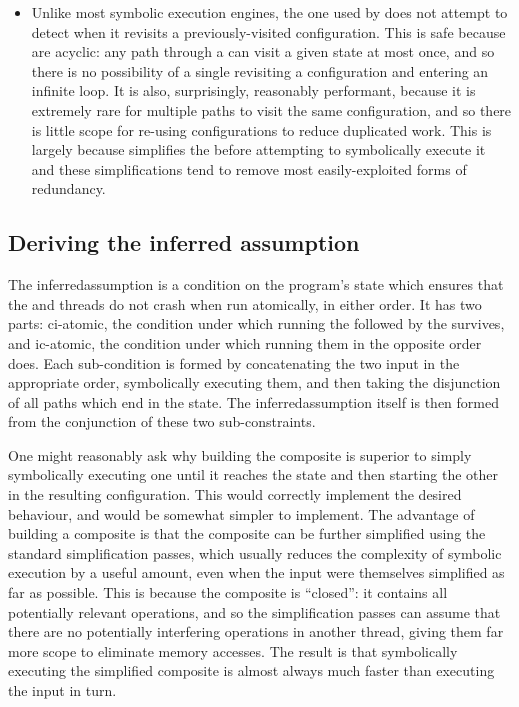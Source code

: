 \begin{itemize}
\item Unlike most symbolic execution engines, the one used by
  {\implementation} does not attempt to detect when it revisits a
  previously-visited configuration.  This is safe because
  {\StateMachines} are acyclic: any path through a {\StateMachine} can
  visit a given state at most once, and so there is no possibility of
  a single revisiting a configuration and entering an infinite loop.
  It is also, surprisingly, reasonably performant, because it is
  extremely rare for multiple paths to visit the same configuration,
  and so there is little scope for re-using configurations to reduce
  duplicated work.  This is largely because {\technique} simplifies
  the {\StateMachine} before attempting to symbolically execute it and
  these simplifications tend to remove most easily-exploited forms of
  redundancy.
\end{itemize}

\subsection{Deriving the inferred assumption}

\label{sect:derive:inferred_assumption}

The \gls{inferredassumption} is a condition on the program's state
which ensures that the  and
 threads do not crash when run
atomically, in either order.  It has two parts: \gls{ci-atomic}, the
condition under which running the 
{\StateMachine} followed by the
 {\StateMachine} survives, and
\gls{ic-atomic}, the condition under which running them in the
opposite order does.  Each sub-condition is formed by concatenating
the two input {\StateMachines} in the appropriate order, symbolically
executing them, and then taking the disjunction of all paths which end
in the {\stSurvive} state.  The \gls{inferredassumption} itself is
then formed from the conjunction of these two sub-constraints.

One might reasonably ask why building the composite {\StateMachine} is
superior to simply symbolically executing one {\StateMachine} until it
reaches the {\stSurvive} state and then starting the other
{\StateMachine} in the resulting configuration.  This would correctly
implement the desired behaviour, and would be somewhat simpler to
implement.  The advantage of building a composite {\StateMachine} is
that the composite {\StateMachine} can be further simplified using the
standard {\StateMachine} simplification passes, which usually reduces
the complexity of symbolic execution by a useful amount, even when the
input {\StateMachines} were themselves simplified as far as possible.
This is because the composite {\StateMachine} is ``closed'': it
contains all potentially relevant operations, and so the
simplification passes can assume that there are no potentially
interfering operations in another thread, giving them far more scope
to eliminate memory accesses.  The result is that symbolically
executing the simplified composite {\StateMachine} is almost always
much faster than executing the input {\StateMachines} in turn.

